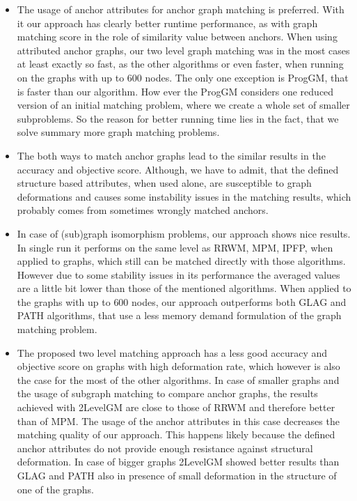 \begin{itemize}
\item The usage of anchor attributes for anchor graph matching is preferred. With it our approach has clearly better runtime performance, as with graph matching score in the role of similarity value between anchors. When using attributed anchor graphs, our two level graph matching was in the most cases at least exactly so fast, as the other algorithms or even faster, when running on the graphs with up to $600$ nodes. The only one exception is ProgGM, that is faster than our algorithm. How ever the ProgGM considers one reduced version of an initial matching problem, where we create a whole set of smaller subproblems. So the reason for better running time lies in the fact, that we solve summary more graph matching problems.
\item The both ways to match anchor graphs lead to the similar results in the accuracy and objective score. Although, we have to admit, that the defined structure based attributes, when used alone, are susceptible to graph deformations and causes some instability issues in the matching results, which probably comes from sometimes wrongly matched anchors.
\item In case of (sub)graph isomorphism problems, our approach shows nice results. In single run it performs on the same level as RRWM, MPM, IPFP, when applied to graphs, which still can be matched directly with those algorithms. However due to some stability issues in its performance the averaged values are a little bit lower than those of the mentioned algorithms. When applied to the graphs with up to $600$ nodes, our approach outperforms both GLAG and PATH algorithms, that use a less memory demand formulation of the graph matching problem.
\item The proposed two level matching approach has a less good accuracy and objective score on graphs with high deformation rate, which however is also the case for the most of the other algorithms. In case of smaller graphs and the usage of subgraph matching to compare anchor graphs, the results achieved with 2LevelGM are close to those of RRWM and therefore better than of MPM. The usage of the anchor attributes in this case decreases the matching quality of our approach.  This happens likely because the defined anchor attributes do not provide enough resistance against structural deformation. In case of bigger graphs 2LevelGM showed better results than GLAG and PATH also in presence of small deformation in the structure of one of the graphs.

\end{itemize}

